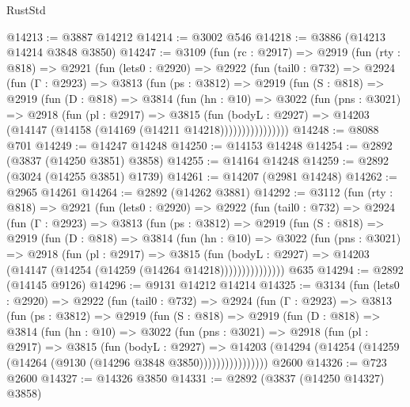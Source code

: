 \begin{lexlean}{RustStd}
\begin{coremodule}
@14213 := @3887 @14212
@14214 := @3002 @546
@14218 := @3886 (@14213 @14214 @3848 @3850)
@14247 := @3109
    (fun (rc : @2917) =>
    @2919
      (fun (rty : @818) =>
      @2921
        (fun (lets0 : @2920) =>
        @2922
          (fun (tail0 : @732) =>
          @2924
            (fun (Γ : @2923) =>
            @3813
              (fun (ps : @3812) =>
              @2919
                (fun (S : @818) =>
                @2919
                  (fun (D : @818) =>
                  @3814
                    (fun (hn : @10) =>
                    @3022
                      (fun (pns : @3021) =>
                      @2918
                        (fun (pl : @2917) =>
                        @3815
                          (fun (bodyL : @2927) =>
                          @14203 (@14147 (@14158 (@14169 (@14211 @14218))))))))))))))))
@14248 := @8088 @701
@14249 := @14247 @14248
@14250 := @14153 @14248
@14254 := @2892 (@3837 (@14250 @3851) @3858)
@14255 := @14164 @14248
@14259 := @2892 (@3024 (@14255 @3851) @1739)
@14261 := @14207 (@2981 @14248)
@14262 := @2965 @14261
@14264 := @2892 (@14262 @3881)
@14292 := @3112
    (fun (rty : @818) =>
    @2921
      (fun (lets0 : @2920) =>
      @2922
        (fun (tail0 : @732) =>
        @2924
          (fun (Γ : @2923) =>
          @3813
            (fun (ps : @3812) =>
            @2919
              (fun (S : @818) =>
              @2919
                (fun (D : @818) =>
                @3814
                  (fun (hn : @10) =>
                  @3022
                    (fun (pns : @3021) =>
                    @2918
                      (fun (pl : @2917) =>
                      @3815
                        (fun (bodyL : @2927) =>
                        @14203 (@14147 (@14254 (@14259 (@14264 @14218)))))))))))))))
    @635
@14294 := @2892 (@14145 @9126)
@14296 := @9131 @14212 @14214
@14325 := @3134
    (fun (lets0 : @2920) =>
    @2922
      (fun (tail0 : @732) =>
      @2924
        (fun (Γ : @2923) =>
        @3813
          (fun (ps : @3812) =>
          @2919
            (fun (S : @818) =>
            @2919
              (fun (D : @818) =>
              @3814
                (fun (hn : @10) =>
                @3022
                  (fun (pns : @3021) =>
                  @2918
                    (fun (pl : @2917) =>
                    @3815
                      (fun (bodyL : @2927) =>
                      @14203
                        (@14294 (@14254 (@14259 (@14264 (@9130 (@14296 @3848 @3850))))))))))))))))
    @2600
@14326 := @723 @2600
@14327 := @14326 @3850
@14331 := @2892 (@3837 (@14250 @14327) @3858)

\end{coremodule}
\end{lexlean}
